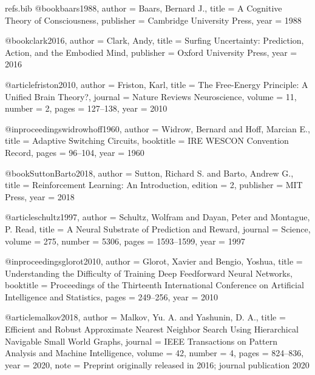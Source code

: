 \begin{filecontents*}{refs.bib}
@book{baars1988,
  author    = {Baars, Bernard J.},
  title     = {A Cognitive Theory of Consciousness},
  publisher = {Cambridge University Press},
  year      = {1988}
}

@book{clark2016,
  author    = {Clark, Andy},
  title     = {Surfing Uncertainty: Prediction, Action, and the Embodied Mind},
  publisher = {Oxford University Press},
  year      = {2016}
}

@article{friston2010,
  author  = {Friston, Karl},
  title   = {The Free-Energy Principle: A Unified Brain Theory?},
  journal = {Nature Reviews Neuroscience},
  volume  = {11},
  number  = {2},
  pages   = {127--138},
  year    = {2010}
}

@inproceedings{widrowhoff1960,
  author    = {Widrow, Bernard and Hoff, Marcian E.},
  title     = {Adaptive Switching Circuits},
  booktitle = {IRE WESCON Convention Record},
  pages     = {96--104},
  year      = {1960}
}

@book{SuttonBarto2018,
  author    = {Sutton, Richard S. and Barto, Andrew G.},
  title     = {Reinforcement Learning: An Introduction},
  edition   = {2},
  publisher = {MIT Press},
  year      = {2018}
}

@article{schultz1997,
  author  = {Schultz, Wolfram and Dayan, Peter and Montague, P. Read},
  title   = {A Neural Substrate of Prediction and Reward},
  journal = {Science},
  volume  = {275},
  number  = {5306},
  pages   = {1593--1599},
  year    = {1997}
}

@inproceedings{glorot2010,
  author    = {Glorot, Xavier and Bengio, Yoshua},
  title     = {Understanding the Difficulty of Training Deep Feedforward Neural Networks},
  booktitle = {Proceedings of the Thirteenth International Conference on Artificial Intelligence and Statistics},
  pages     = {249--256},
  year      = {2010}
}

@article{malkov2018,
  author  = {Malkov, Yu. A. and Yashunin, D. A.},
  title   = {Efficient and Robust Approximate Nearest Neighbor Search Using Hierarchical Navigable Small World Graphs},
  journal = {IEEE Transactions on Pattern Analysis and Machine Intelligence},
  volume  = {42},
  number  = {4},
  pages   = {824--836},
  year    = {2020},
  note    = {Preprint originally released in 2016; journal publication 2020}
}
\end{filecontents*}

\documentclass[12pt,a4paper,oneside]{article}


